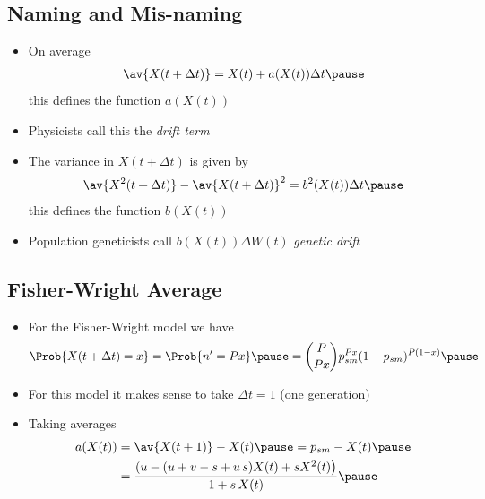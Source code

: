 
\begin{slide}
\section[-1]{Naming and Mis-naming}

\begin{PauseHighLight}
  \begin{itemize}
  \item On average
    \begin{align*}
      \av{X(t+\Delta t)} = X(t) + a(X(t)) \Delta t\pause
    \end{align*}
    this defines the function $a(X(t))$\pause
  \item Physicists call this the \textit{drift term}\pause
  \item The variance in $X(t+\Delta t)$ is given by
    \begin{align*}
      \av{X^2(t+\Delta t)} - \av{X(t+\Delta t)}^2 = b^2(X(t)) \Delta t\pause
    \end{align*}
    this defines the function $b(X(t))$\pause
  \item Population geneticists call $b(X(t)) \Delta W(t)$
  \textit{genetic drift}\pause
  \end{itemize}
\end{PauseHighLight}

\end{slide}


\begin{slide}
\section{Fisher-Wright Average}

\begin{PauseHighLight}
  \begin{itemize}
  \item For the Fisher-Wright model we have
    \begin{align*}
      \Prob{X(t+\Delta t)=x} = \Prob{n'=Px} \pause
      = \binom{P}{Px} p_{sm}^{Px} ( 1 - p_{sm})^{P(1-x)} \pause
    \end{align*}
  \item For this model it makes sense to take $\Delta t =1$ (one
    generation)\pause
  \item Taking averages
    \begin{align*}
      a(X(t)) &= \av{X(t+1)}-X(t) \pause
      = p_{sm} - X(t) \pause \\
      &= \frac{(u - (u+v-s+u\,s) X(t) + s X^2(t)
        \bigr)}{1+s\,X(t)}\pause
    \end{align*}
  \end{itemize}
\end{PauseHighLight}

\end{slide}

